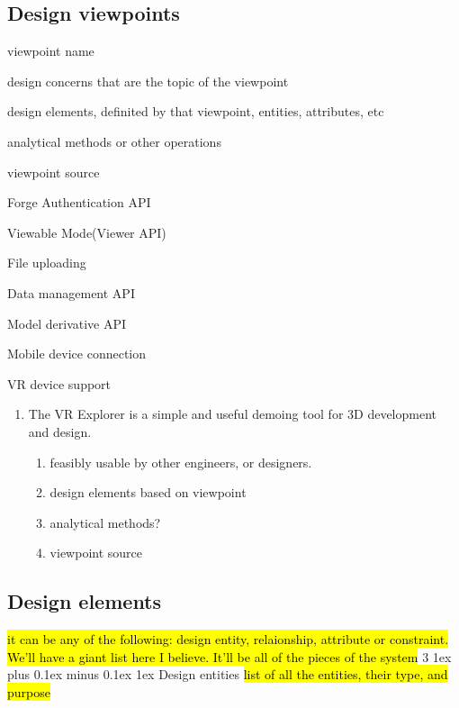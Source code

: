 \documentclass[letterpaper, 10pt, draftclsnofoot, compsoc, onecolumn]{IEEEtran}
\makeatletter
\def\subsubsection{\@startsection{subsubsection}%
                                 {3}%
                                 {\z@}%
                                 {1ex plus 0.1ex minus 0.1ex}%
                                 {1ex}%
                                 {\normalfont\normalsize}}%
\makeatother
\begin{document}
\subsection{Design viewpoints}
	\begin{description}
	\item{viewpoint name}
	\item{design concerns that are the topic of the viewpoint}
	\item{design elements, definited by that viewpoint, entities, attributes, etc}
	\item{analytical methods or other operations}
	\item{viewpoint source}

	\item{Forge Authentication API}
	\item{Viewable Mode(Viewer API)}
	\item{File uploading}
	\item{Data management API}
	\item{Model derivative API}
	\item{Mobile device connection}
	\item{VR device support}


	\end{description}

	\begin{enumerate}
		\item{The VR Explorer is a simple and useful demoing tool for 3D development and design.}
			\begin{enumerate}
				\item{feasibly usable by other engineers, or designers. }
				\item{design elements based on viewpoint}
				\item{analytical methods?}
				\item{viewpoint source}
			\end{enumerate}
	\end{enumerate}

\subsection{Design elements}
	\hl{it can be any of the following: design entity, relaionship, attribute or constraint. We'll have a giant list here I believe. It'll be all of the pieces of the system}
\subsubsection{Design entities}
	\hl{list of all the entities, their type, and purpose}
\end{document}
